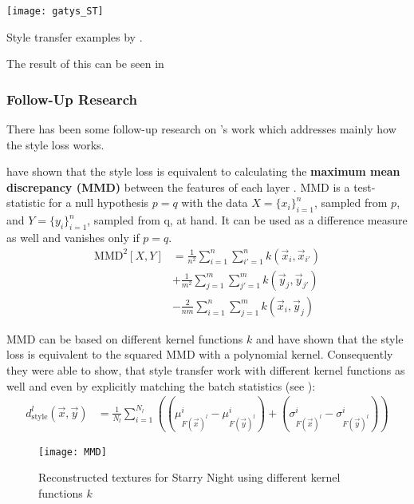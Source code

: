 \begin{marginfigure}
    \texttt{[image: gatys\_ST]}
    \caption[]{Style transfer examples by \citeauthor*{gatys}. \cite{gatys}}
\end{marginfigure}

The result of this can be seen in 

\subsubsection{Follow-Up Research}
There has been some follow-up research on \citeauthor*{gatys}'s work which addresses mainly how the style loss works.

\citeauthor*{MMD} have shown that the style loss is equivalent to calculating the \textbf{maximum mean discrepancy (MMD)} between the features of each layer \cite{MMD}.
MMD is a test-statistic for a null hypothesis $p=q$ with the data $X = \{x_i\}^n_{i=1}$, sampled from $p$, and $Y = \{y_i\}^n_{i=1}$, sampled from q, at hand.
It can be used as a difference measure as well and vanishes only if $p=q$.
\begin{align}
    \text{MMD}^2[X, Y] & = \frac{1}{n^2} \sum^n_{i=1} \sum^n_{i'=1} k(\vec{x}_i, \vec{x}_{i'}) \\
    & + \frac{1}{m^2} \sum^m_{j=1} \sum^m_{j'=1} k(\vec{y}_j, \vec{y}_{j'}) \\
    & - \frac{2}{nm} \sum^n_{i=1} \sum^m_{j=1} k(\vec{x}_i, \vec{y}_{j})
\end{align}

MMD can be based on different kernel functions $k$ and \citeauthor*{MMD} have shown that the style loss is equivalent to the squared MMD with a polynomial kernel.
Consequently they were able to show, that style transfer work with different kernel functions as well and even by explicitly matching the batch statistics (see ):
\begin{align}
    d_{\text{style}}^l(\vec{x}, \vec{y}) & = \frac{1}{N_l} \sum_{i = 1}^{N_l} \left( (\mu^i_{F(\vec{x})^l} - \mu^i_{F(\vec{y})^l}) + (\sigma^i_{F(\vec{x})^l} - \sigma^i_{F(\vec{y})^l}) \right)
\end{align}

\begin{figure}
    \texttt{[image: MMD]}
    \caption[]{Reconstructed textures for Starry Night using different kernel functions $k$ \cite{MMD}}
\end{figure}


